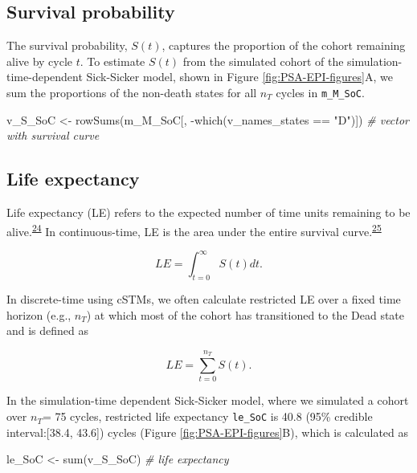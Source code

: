 \documentclass[
]{article}
\newenvironment{Shaded}{\begin{snugshade}}{\end{snugshade}}
\newcommand{\CommentTok}[1]{\textcolor[rgb]{0.56,0.35,0.01}{\textit{#1}}}
\newcommand{\FunctionTok}[1]{\textcolor[rgb]{0.00,0.00,0.00}{#1}}
\newcommand{\NormalTok}[1]{#1}
\newcommand{\OtherTok}[1]{\textcolor[rgb]{0.56,0.35,0.01}{#1}}
\newcommand{\SpecialCharTok}[1]{\textcolor[rgb]{0.00,0.00,0.00}{#1}}
\newcommand{\StringTok}[1]{\textcolor[rgb]{0.31,0.60,0.02}{#1}}
\begin{document}
\hypertarget{survival-probability}{%
\subsection{Survival probability}\label{survival-probability}}

The survival probability, \(S(t)\), captures the proportion of the cohort remaining alive by cycle \(t\). To estimate \(S(t)\) from the simulated cohort of the simulation-time-dependent Sick-Sicker model, shown in Figure \ref{fig:PSA-EPI-figures}A, we sum the proportions of the non-death states for all \(n_T\) cycles in \texttt{m\_M\_SoC}.

\begin{Shaded}
\begin{Highlighting}[]
\NormalTok{v\_S\_SoC }\OtherTok{\textless{}{-}} \FunctionTok{rowSums}\NormalTok{(m\_M\_SoC[, }\SpecialCharTok{{-}}\FunctionTok{which}\NormalTok{(v\_names\_states }\SpecialCharTok{==} \StringTok{"D"}\NormalTok{)]) }\CommentTok{\# vector with survival curve}
\end{Highlighting}
\end{Shaded}

\hypertarget{life-expectancy}{%
\subsection{Life expectancy}\label{life-expectancy}}

Life expectancy (LE) refers to the expected number of time units remaining to be alive.\textsuperscript{\protect\hyperlink{ref-Lee2003a}{24}} In continuous-time, LE is the area under the entire survival curve.\textsuperscript{\protect\hyperlink{ref-Klein2003}{25}}

\[
LE = \int_{t=0}^{\infty}{S(t) dt}.
\]

In discrete-time using cSTMs, we often calculate restricted LE over a fixed time horizon (e.g., \(n_T\)) at which most of the cohort has transitioned to the Dead state and is defined as

\[
  LE = \sum_{t=0}^{n_T}{S(t)}.
\]

In the simulation-time dependent Sick-Sicker model, where we simulated a cohort over \(n_T\)= 75 cycles, restricted life expectancy \texttt{le\_SoC} is 40.8 (95\% credible interval:{[}38.4, 43.6{]}) cycles (Figure \ref{fig:PSA-EPI-figures}B), which is calculated as

\begin{Shaded}
\begin{Highlighting}[]
\NormalTok{le\_SoC }\OtherTok{\textless{}{-}} \FunctionTok{sum}\NormalTok{(v\_S\_SoC) }\CommentTok{\# life expectancy}
\end{Highlighting}
\end{Shaded}
\end{document}
